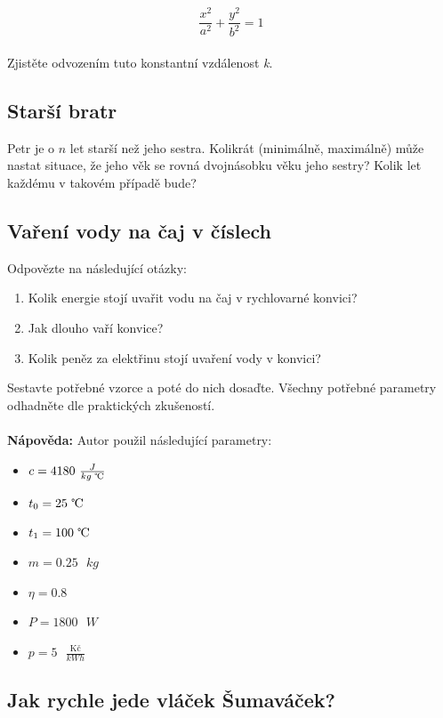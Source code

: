 \documentclass[a4paper,12pt]{article}
\begin{document}
\begin{equation*}
  \frac{x^2}{a^2} + \frac{y^2}{b^2} = 1
\end{equation*}
\\
Zjistěte odvozením tuto konstantní vzdálenost \textit{k}.
 
\subsection{Starší bratr}

Petr je o $n$ let starší než jeho sestra. Kolikrát (minimálně, maximálně) může nastat situace, že jeho věk se rovná dvojnásobku věku jeho sestry? Kolik let každému v takovém případě bude?

\subsection{Vaření vody na čaj v číslech}

Odpovězte na následující otázky:

\begin{enumerate}
 \item Kolik energie stojí uvařit vodu na čaj v rychlovarné konvici?
 \item Jak dlouho vaří konvice?
 \item Kolik peněz za elektřinu stojí uvaření vody v konvici?
\end{enumerate}

Sestavte potřebné vzorce a poté do nich dosaďte.
Všechny potřebné parametry odhadněte dle praktických zkušeností.
\\ \\
\textbf{Nápověda:} Autor použil následující parametry:

\begin{itemize}
 \item $c = 4 180 \text{ } \frac{J}{ kg \text{ \textcelsius}}$
 \item $t_0 = 25 \text{ \textcelsius}$
 \item $t_1 = 100 \text{ \textcelsius}$
 \item $m = 0.25 \text{ }kg$
 \item $\eta = 0.8$ 
 \item $P = 1 800 \text{ }W$
 \item $p = 5 \text{ } \frac{\text{Kč}}{kWh}$
\end{itemize}

\subsection{Jak rychle jede vláček Šumaváček?}
\end{document}
